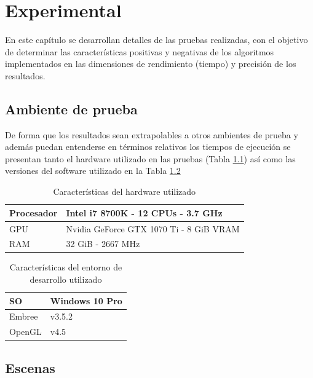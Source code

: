 \chapter{Experimental}
\label{ch:chap05}

En este capítulo se desarrollan detalles de las pruebas realizadas, con el objetivo de determinar las características positivas y negativas de los algoritmos implementados en las dimensiones de rendimiento (tiempo) y precisión de los resultados.

\section{Ambiente de prueba}
\label{sec:hardware}

De forma que los resultados sean extrapolables a otros ambientes de prueba y además puedan entenderse en términos relativos los tiempos de ejecución se presentan tanto el hardware utilizado en las pruebas (Tabla \ref{table:hardware}) así como las versiones del software utilizado en la Tabla \ref{table:software}

\begin{table}[H]
	\centering
	\begin{tabular}{l|l}
		Procesador & Intel i7 8700K - 12 CPUs - 3.7 GHz       \\
		\hline
		GPU        & Nvidia GeForce GTX 1070 Ti - 8 GiB  VRAM \\
		\hline
		RAM        & 32 GiB - 2667 MHz                        \\
		\hline
	\end{tabular}
	\caption{Características del hardware utilizado}
	\label{table:hardware}
\end{table}

\begin{table}[H]
	\centering
	\begin{tabular}{l|l}
	SO & Windows 10 Pro        \\
		\hline
	Embree        & v3.5.2 \\
		\hline
		OpenGL        & v4.5  \\
		\hline
	\end{tabular}
	\caption{Características del entorno de desarrollo utilizado}
		\label{table:software}
\end{table}

\section{Escenas}
\label{sec:escenas}

